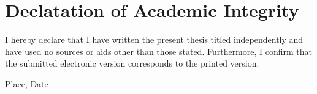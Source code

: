 \clearpage
\chapter*{Declatation of Academic Integrity}

I hereby declare that I have written the present thesis titled \textit{\DerTitelDerArbeit} independently 
and have used no sources or aids other than those stated. Furthermore, I confirm that 
the submitted electronic version corresponds to the printed version.

\vspace{3cm}
Place, Date \hfill \DerAutorDerArbeit
